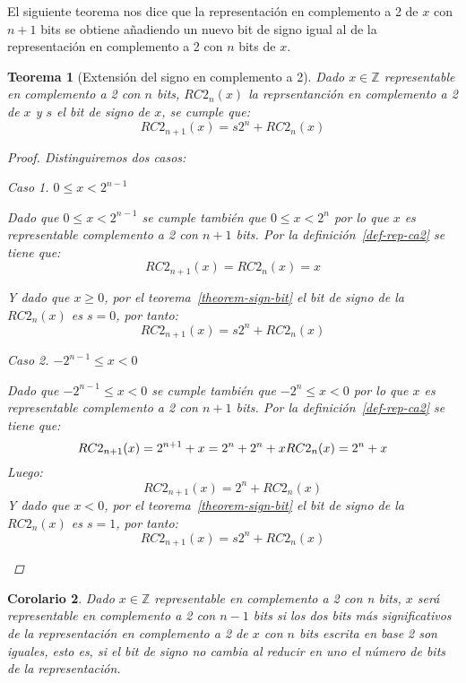 \documentclass[spanish,a4paper,12pt,titlepage]{article}
\newtheorem{theorem}{Teorema}%
\newtheorem{corollary}[theorem]{Corolario}
\theoremstyle{definition}
\theoremstyle{remark}
\newtheorem{case}{Caso}
\newcommand{\bbZ}{\mathbb{Z}}
\begin{document}
El siguiente teorema nos dice que la representación en complemento a 2 de $x$ con $n+1$ bits se obtiene añadiendo un nuevo bit de signo igual al de la representación en complemento a 2 con $n$ bits de $x$.

\begin{theorem}[Extensión del signo en complemento a 2]
  Dado $x \in \bbZ$ representable en complemento a 2 con $n$ bits, $RC2_n(x)$ la reprsentanción en complemento a 2 de $x$ y $s$ el bit de signo de $x$, se cumple que:
  \[
      RC2_{n+1}(x) = s 2^n + RC2_n(x)
  \]
  \begin{proof}
      Distinguiremos dos casos:
    \begin{case}
      $0 \le x < 2^{n-1}$

      Dado que $0 \le x < 2^{n-1}$ se cumple también que $0 \le x < 2^n$ por lo que $x$ es representable complemento a 2 con $n+1$ bits. Por la definición~\ref{def-rep-ca2} se tiene que:
      \[
        RC2_{n+1}(x) = RC2_n(x) = x
      \]

      Y dado que $x \ge 0$, por el teorema~\ref{theorem-sign-bit} el bit de signo de la $RC2_n(x)$ es $s=0$, por tanto:
      \[
        RC2_{n+1}(x) = s 2^n + RC2_n(x)
      \]
    \end{case}
    \begin{case}
      $-2^{n-1} \le x < 0$

      Dado que $-2^{n-1} \le x < 0$ se cumple también que $-2^n \le x < 0$ por lo que $x$ es representable complemento a 2 con $n+1$ bits. Por la definición~\ref{def-rep-ca2} se tiene que:
      \[
        RC2_{n+1}(x) = 2^{n+1} + x = 2^n + 2^n + x\\
        RC2_n(x) = 2^n + x
      \]
      Luego:
      \[
        RC2_{n+1}(x) = 2^n + RC2_n(x)
      \]
      Y dado que $x < 0$, por el teorema~\ref{theorem-sign-bit} el bit de signo de la $RC2_n(x)$ es $s=1$, por tanto:
      \[
        RC2_{n+1}(x) = s 2^n + RC2_n(x)
      \]
    \end{case}
  \end{proof}
\end{theorem}

\begin{corollary}
  Dado $x \in \bbZ$ representable en complemento a 2 con n bits, $x$ será representable en complemento a 2 con $n-1$ bits si los dos bits más significativos de la representación en complemento a 2 de $x$ con $n$ bits escrita en base 2 son iguales, esto es, si el bit de signo no cambia al reducir en uno el número de bits de la representación.
\end{corollary}
\end{document}
